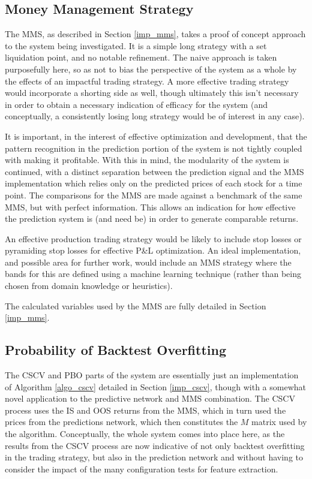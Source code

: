 \documentclass[a4paper,11pt,oneside]{article}
\theoremstyle{plain}
\theoremstyle{definition}
\begin{document}
	\subsection{Money Management Strategy}\label{proc_mms}
	
	The MMS, as described in Section \ref{imp_mms}, takes a proof of concept approach to the system being investigated. It is a simple long strategy with a set liquidation point, and no notable refinement. The naive approach is taken purposefully here, so as not to bias the perspective of the system as a whole by the effects of an impactful trading strategy. A more effective trading strategy would incorporate a shorting side as well, though ultimately this isn't necessary in order to obtain a necessary indication of efficacy for the system (and conceptually, a consistently losing long strategy would be of interest in any case).  \newline
	
	It is important, in the interest of effective optimization and development, that the pattern recognition in the prediction portion of the system is not tightly coupled with making it profitable. With this in mind, the modularity of the system is continued, with a distinct separation between the prediction signal and the MMS implementation which relies only on the predicted prices of each stock for a time point. The comparisons for the MMS are made against a benchmark of the same MMS, but with perfect information. This allows an indication for how effective the prediction system is (and need be) in order to generate comparable returns. \newline
	
	An effective production trading strategy would be likely to include stop losses or pyramiding stop losses for effective P\&L optimization. An ideal implementation, and possible area for further work, would include an MMS strategy where the bands for this are defined using a machine learning technique (rather than being chosen from domain knowledge or heuristics).\newline
	
	The calculated variables used by the MMS are fully detailed in Section \ref{imp_mms}.
	
	\subsection{Probability of Backtest Overfitting}\label{proc_cscv}
	
	The CSCV and PBO parts of the system are essentially just an implementation of Algorithm \ref{algo_cscv} detailed in Section \ref{imp_cscv}, though with a somewhat novel application to the predictive network and MMS combination. The CSCV process uses the IS and OOS returns from the MMS, which in turn used the prices from the predictions network, which then constitutes the $M$ matrix used by the algorithm. Conceptually, the whole system comes into place here, as the results from the CSCV process are now indicative of not only backtest overfitting in the trading strategy, but also in the prediction network and without having to consider the impact of the many configuration tests for feature extraction.
	
\end{document}
